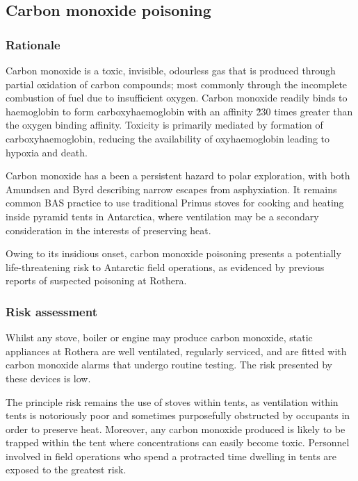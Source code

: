 \documentclass[12pt,a4paper]{article}
\begin{document}
\subsection{Carbon monoxide poisoning}

\subsubsection{Rationale}

Carbon monoxide is a toxic, invisible, odourless gas that is produced through partial oxidation of carbon compounds; most commonly through the incomplete combustion of fuel due to insufficient oxygen. Carbon monoxide readily binds to haemoglobin to form carboxyhaemoglobin with an affinity \~230 times greater than the oxygen binding affinity.\cite{Townsend:2002cy} Toxicity is primarily mediated by formation of carboxyhaemoglobin, reducing the availability of oxyhaemoglobin leading to hypoxia and death.

Carbon monoxide has a been a persistent hazard to polar exploration, with both Amundsen and Byrd describing narrow escapes from asphyxiation.\cite{Pugh:1959uo} It remains common BAS practice to use traditional Primus stoves for cooking and heating inside pyramid tents in Antarctica, where ventilation may be a secondary consideration in the interests of preserving heat.

Owing to its insidious onset, carbon monoxide poisoning presents a potentially life-threatening risk to Antarctic field operations, as evidenced by previous reports of suspected poisoning at Rothera.\cite{BritishAntarcticSurveyMedicalUnit:2013vj}

\subsubsection{Risk assessment}

Whilst any stove, boiler or engine may produce carbon monoxide, static appliances at Rothera are well ventilated, regularly serviced, and are fitted with carbon monoxide alarms that undergo routine testing. The risk presented by these devices is low.

The principle risk remains the use of stoves within tents, as ventilation within tents is notoriously poor and sometimes purposefully obstructed by occupants in order to preserve heat. Moreover, any carbon monoxide produced is likely to be trapped within the tent where concentrations can easily become toxic.\cite{Thomassen:2004ux,LeighSmith:2005vj,Hampson:2005vj,Betten:2013he} Personnel involved in field operations who spend a protracted time dwelling in tents are exposed to the greatest risk.
\end{document}
